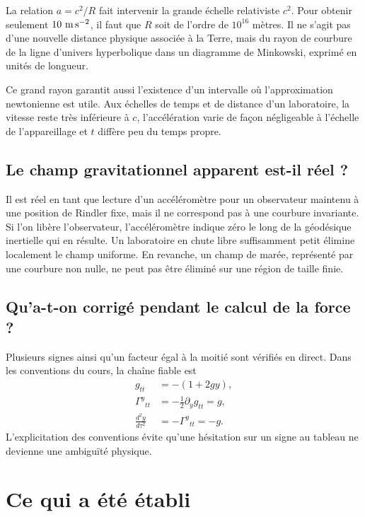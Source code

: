 La relation \(a=c^2/R\) fait intervenir la grande échelle relativiste \(c^2\). Pour obtenir seulement \(10\ {\rm m\,s^{-2}}\), il faut que \(R\) soit de l'ordre de \(10^{16}\) mètres. Il ne s'agit pas d'une nouvelle distance physique associée à la Terre, mais du rayon de courbure de la ligne d'univers hyperbolique dans un diagramme de Minkowski, exprimé en unités de longueur.

Ce grand rayon garantit aussi l'existence d'un intervalle où l'approximation newtonienne est utile. Aux échelles de temps et de distance d'un laboratoire, la vitesse reste très inférieure à \(c\), l'accélération varie de façon négligeable à l'échelle de l'appareillage et \(t\) diffère peu du temps propre.

\subsection{Le champ gravitationnel apparent est-il réel ?}

Il est réel en tant que lecture d'un accéléromètre pour un observateur maintenu à une position de Rindler fixe, mais il ne correspond pas à une courbure invariante. Si l'on libère l'observateur, l'accéléromètre indique zéro le long de la géodésique inertielle qui en résulte. Un laboratoire en chute libre suffisamment petit élimine localement le champ uniforme. En revanche, un champ de marée, représenté par une courbure non nulle, ne peut pas être éliminé sur une région de taille finie.

\subsection{Qu'a-t-on corrigé pendant le calcul de la force ?}

Plusieurs signes ainsi qu'un facteur égal à la moitié sont vérifiés en direct. Dans les conventions du cours, la chaîne fiable est
\begin{equation}
\begin{aligned}
g_{tt}&=-(1+2gy),\\
\Gamma^y{}_{tt}&=-\frac12\partial_yg_{tt}=g,\\
\frac{d^2y}{d\tau^2}&=-\Gamma^y{}_{tt}=-g.
\end{aligned}
\end{equation}
L'explicitation des conventions évite qu'une hésitation sur un signe au tableau ne devienne une ambiguïté physique.

\section{Ce qui a été établi}

